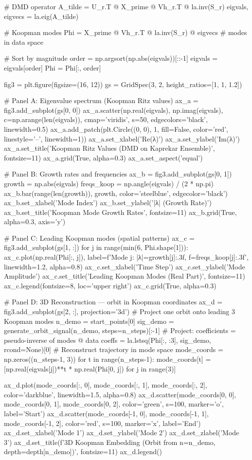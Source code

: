 {{{{{{{{{{{{{# DMD operator
A_tilde = U_r.T @ X_prime @ Vh_r.T @ la.inv(S_r)
eigvals, eigvecs = la.eig(A_tilde)

# Koopman modes
Phi = X_prime @ Vh_r.T @ la.inv(S_r) @ eigvecs  # modes in data space

# Sort by magnitude
order = np.argsort(np.abs(eigvals))[::-1]
eigvals = eigvals[order]
Phi = Phi[:, order]

fig3 = plt.figure(figsize=(16, 12))
gs = GridSpec(3, 2, height_ratios=[1, 1, 1.2])

# Panel A: Eigenvalue spectrum (Koopman Ritz values)
ax_a = fig3.add_subplot(gs[0, 0])
ax_a.scatter(np.real(eigvals), np.imag(eigvals), c=np.arange(len(eigvals)), 
             cmap='viridis', s=50, edgecolors='black', linewidth=0.5)
ax_a.add_patch(plt.Circle((0, 0), 1, fill=False, color='red', linestyle='--', linewidth=1))
ax_a.set_xlabel('Re(λ)')
ax_a.set_ylabel('Im(λ)')
ax_a.set_title('Koopman Ritz Values (DMD on Kaprekar Ensemble)', fontsize=11)
ax_a.grid(True, alpha=0.3)
ax_a.set_aspect('equal')

# Panel B: Growth rates and frequencies
ax_b = fig3.add_subplot(gs[0, 1])
growth = np.abs(eigvals)
freqs_koop = np.angle(eigvals) / (2 * np.pi)
ax_b.bar(range(len(growth)), growth, color='steelblue', edgecolor='black')
ax_b.set_xlabel('Mode Index')
ax_b.set_ylabel('|λ| (Growth Rate)')
ax_b.set_title('Koopman Mode Growth Rates', fontsize=11)
ax_b.grid(True, alpha=0.3, axis='y')

# Panel C: Leading Koopman modes (spatial patterns)
ax_c = fig3.add_subplot(gs[1, :])
for j in range(min(6, Phi.shape[1])):
    ax_c.plot(np.real(Phi[:, j]), label=f'Mode {j}: |λ|={growth[j]:.3f}, f={freqs_koop[j]:.3f}',
              linewidth=1.2, alpha=0.8)
ax_c.set_xlabel('Time Step')
ax_c.set_ylabel('Mode Amplitude')
ax_c.set_title('Leading Koopman Modes (Real Part)', fontsize=11)
ax_c.legend(fontsize=8, loc='upper right')
ax_c.grid(True, alpha=0.3)

# Panel D: 3D Reconstruction — orbit in Koopman coordinates
ax_d = fig3.add_subplot(gs[2, :], projection='3d')
# Project one orbit onto leading 3 Koopman modes
n_demo = start_points[0]
sig_demo = generate_orbit_signal(n_demo, steps=n_steps)[:-1]
# Project: coefficients = pseudo-inverse of modes @ data
coeffs = la.lstsq(Phi[:, :3], sig_demo, rcond=None)[0]
# Reconstruct trajectory in mode space
mode_coords = np.zeros((n_steps-1, 3))
for t in range(n_steps-1):
    mode_coords[t] = [np.real(eigvals[j])**t * np.real(Phi[0, j]) for j in range(3)]

ax_d.plot(mode_coords[:, 0], mode_coords[:, 1], mode_coords[:, 2], 
          color='darkblue', linewidth=1.5, alpha=0.8)
ax_d.scatter(mode_coords[0, 0], mode_coords[0, 1], mode_coords[0, 2], 
             color='green', s=100, marker='o', label='Start')
ax_d.scatter(mode_coords[-1, 0], mode_coords[-1, 1], mode_coords[-1, 2], 
             color='red', s=100, marker='x', label='End')
ax_d.set_xlabel('Mode 1')
ax_d.set_ylabel('Mode 2')
ax_d.set_zlabel('Mode 3')
ax_d.set_title(f'3D Koopman Embedding (Orbit from n={n_demo}, depth={depth[n_demo]})', fontsize=11)
ax_d.legend()

}}}}}}}}}}}}}
